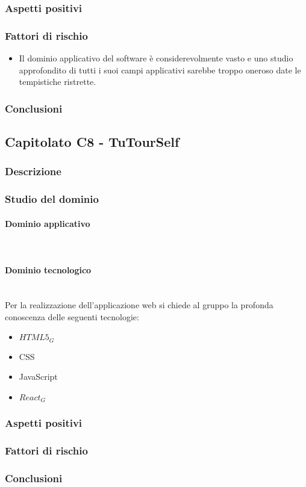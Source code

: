 		\subsubsection{Aspetti positivi}
		\subsubsection{Fattori di rischio}
		\begin{itemize}
			\item Il dominio applicativo del software è considerevolmente vasto e uno studio approfondito di tutti i suoi campi applicativi sarebbe troppo oneroso date le tempistiche ristrette.
		\end{itemize}
		\subsubsection{Conclusioni}
	
	\subsection{Capitolato C8 - TuTourSelf}
		\subsubsection{Descrizione}
		\subsubsection{Studio del dominio}
			\paragraph{Dominio applicativo}
			\mbox{}\\
			\paragraph{Dominio tecnologico}
			\mbox{}\\
			Per la realizzazione dell'applicazione web si chiede al gruppo la profonda conoscenza delle seguenti tecnologie:
			\begin{itemize}
				\item $HTML5_G$
				\item CSS
				\item JavaScript
				\item $React_G$
			\end{itemize}
		\subsubsection{Aspetti positivi}
		\subsubsection{Fattori di rischio}
		\subsubsection{Conclusioni}
	
	
	